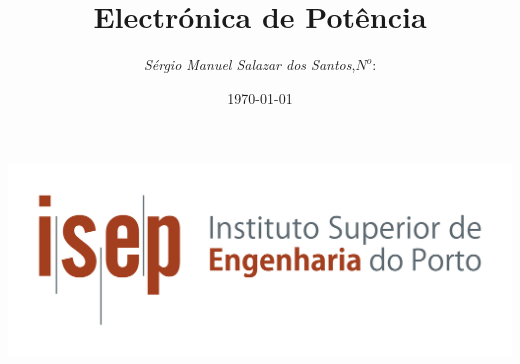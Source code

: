 \begin{titlepage}
\begin{minipage}{0.95\linewidth}
\centering
\includegraphics[scale=0.60]{./image/ISEP_marca_cor_grande.png}
\label{Capa}
\title{Electr\'{o}nica de Pot\^{e}ncia}
\author{\emph{S\'{e}rgio Manuel Salazar dos Santos},\;$N^o$:}
\date{\today}
\maketitle
\end{minipage}
\end{titlepage}
